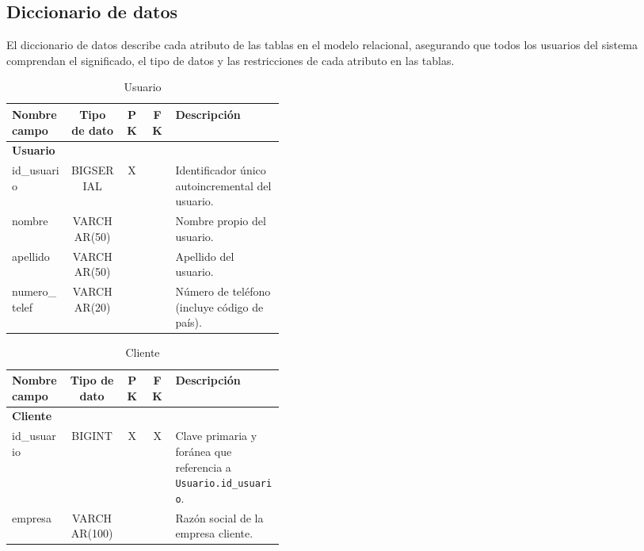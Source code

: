 \documentclass[12pt,a4paper]{article}
\begin{document}
\subsection{Diccionario de datos}

El diccionario de datos describe cada atributo de las tablas en el modelo relacional, asegurando que todos los usuarios del sistema comprendan el significado, el tipo de datos y las restricciones de cada atributo en las tablas.

\begin{table}[h!]
\centering
\begin{tabular}{|l|c|c|c|p{0.4\linewidth}|}
\hline
\textbf{Nombre campo}      & \textbf{Tipo de dato} & \textbf{PK} & \textbf{FK} & \textbf{Descripción} \\
\hline
\multicolumn{5}{|l|}{\textbf{Usuario}} \\
\hline
id\_usuario                & BIGSERIAL             & X           &             & Identificador único autoincremental del usuario. \\
nombre                     & VARCHAR(50)           &             &             & Nombre propio del usuario. \\
apellido                   & VARCHAR(50)           &             &             & Apellido del usuario. \\
numero\_telef              & VARCHAR(20)           &             &             & Número de teléfono (incluye código de país). \\
\hline
\end{tabular}
\caption{Usuario}
\label{table:usuario}
\end{table}


\begin{table}[h!]
\centering
\begin{tabular}{|l|c|c|c|p{0.4\linewidth}|}
\hline
\textbf{Nombre campo}      & \textbf{Tipo de dato} & \textbf{PK} & \textbf{FK} & \textbf{Descripción} \\
\hline
\multicolumn{5}{|l|}{\textbf{Cliente}} \\
\hline
id\_usuario                & BIGINT                & X           & X           & Clave primaria y foránea que referencia a \texttt{Usuario.id\_usuario}. \\
empresa                    & VARCHAR(100)          &             &             & Razón social de la empresa cliente. \\
\hline
\end{tabular}
\caption{Cliente}
\label{table:cliente}
\end{table}
\end{document}
